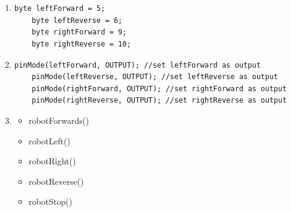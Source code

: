 \documentclass[]{bilingualworkshop}
\title{\en{Aberystwyth Robotics Club - Magician Chassis - Programming Instructions}\cy{Teitl Cymraeg}}
\begin{document}
    \maketitle
    
    \section*{%
    }
    


    \begin{enumerate} %
    
    \item{
    
    \begin{lstlisting}[language=arduino,numbers=none]
    byte leftForward = 5;
    byte leftReverse = 6;
    byte rightForward = 9;
    byte rightReverse = 10;
    \end{lstlisting}}
    
    \item{
    
    \begin{lstlisting}[language=arduino,numbers=none]
    pinMode(leftForward, OUTPUT); //set leftForward as output
    pinMode(leftReverse, OUTPUT); //set leftReverse as output
    pinMode(rightForward, OUTPUT); //set rightForward as output
    pinMode(rightReverse, OUTPUT); //set rightReverse as output
    \end{lstlisting}}
    
    \item{
    
    \begin{itemize}
    
    \item robotForwards()
    \item robotLeft()
    \item robotRight()
    \item robotReverse()
    \item robotStop()
    

\end{itemize}}
\end{enumerate}
\end{document}
